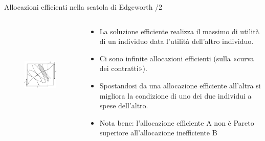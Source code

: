 \documentclass[aspectratio=64,12pt]{beamer}
\begin{document}
\begin{frame}{Allocazioni efficienti nella scatola di Edgeworth /2}
\begin{columns}
\begin{column}{.5\columnwidth}
\begin{figure}
\centering
\includegraphics[height=5cm]{./figure/edgeworth-1.pdf}
\end{figure}
\end{column}

\begin{column}{.5\columnwidth}
\begin{itemize}
\item La soluzione efficiente realizza il massimo di utilità di un individuo data l’utilità dell’altro individuo.
\item Ci sono infinite allocazioni efficienti (sulla «curva dei contratti»).
\item Spostandosi da una allocazione efficiente all’altra si migliora la condizione di uno dei due individui a spese dell’altro.
\item Nota bene: l’allocazione efficiente A non è Pareto superiore all’allocazione inefficiente B
\end{itemize}
\end{column}
\end{columns}
\end{frame}
\end{document}
